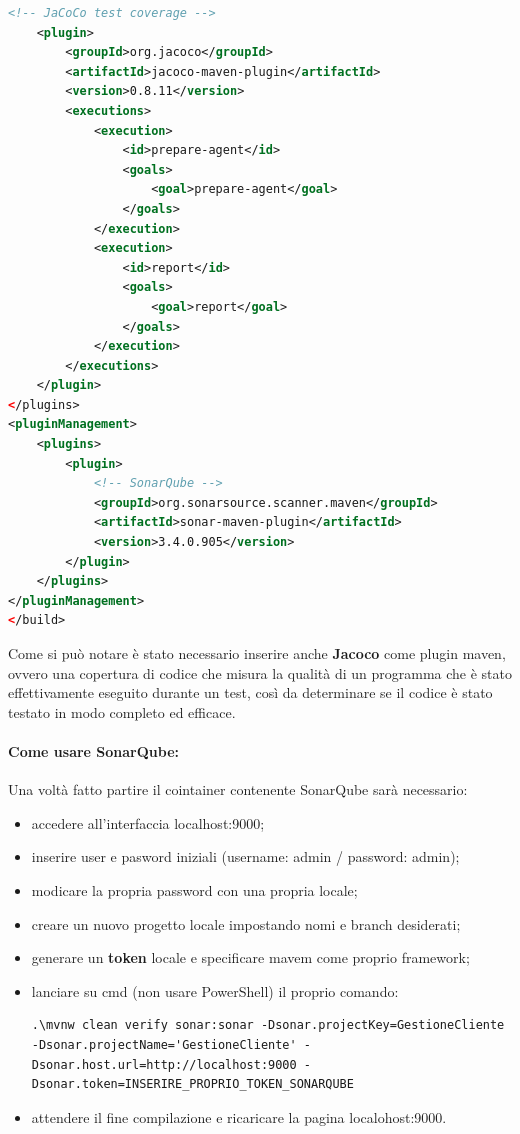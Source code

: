 \begin{lstlisting}[language=XML, caption={Implementazioni pom.xml}]
    <!-- JaCoCo test coverage -->
    <plugin>
        <groupId>org.jacoco</groupId>
        <artifactId>jacoco-maven-plugin</artifactId>
        <version>0.8.11</version>
        <executions>
            <execution>
                <id>prepare-agent</id>
                <goals>
                    <goal>prepare-agent</goal>
                </goals>
            </execution>
            <execution>
                <id>report</id>
                <goals>
                    <goal>report</goal>
                </goals>
            </execution>
        </executions>
    </plugin>
</plugins>
<pluginManagement>
    <plugins>
        <plugin>
            <!-- SonarQube -->
            <groupId>org.sonarsource.scanner.maven</groupId>
            <artifactId>sonar-maven-plugin</artifactId>
            <version>3.4.0.905</version>
        </plugin>
    </plugins>
</pluginManagement>
</build>
\end{lstlisting}

Come si può notare è stato necessario inserire anche \textbf{Jacoco}\cite{Jacoco} come plugin maven, ovvero una copertura di codice che misura la qualità di un programma che è stato effettivamente eseguito durante un test, così da determinare se il codice è stato testato in modo completo ed efficace.

\paragraph{Come usare SonarQube:}

Una voltà fatto partire il cointainer contenente SonarQube sarà necessario:

\begin{itemize}
 \item accedere all'interfaccia localhost:9000;
 \item inserire user e pasword iniziali (username: admin / password: admin);
 \item modicare la propria password con una propria locale;
 \item creare un nuovo progetto locale impostando nomi e branch desiderati;
 \item generare un \textbf{token} locale e specificare mavem come proprio framework;
 \item lanciare su cmd (non usare PowerShell) il proprio comando:
\begin{lstlisting}[style=terminal, 
	caption={Avvio sonarqube}]
    .\mvnw clean verify sonar:sonar -Dsonar.projectKey=GestioneCliente -Dsonar.projectName='GestioneCliente' -Dsonar.host.url=http://localhost:9000 -Dsonar.token=INSERIRE_PROPRIO_TOKEN_SONARQUBE
\end{lstlisting}
\item attendere il fine compilazione e ricaricare la pagina localohost:9000.
\end{itemize}

